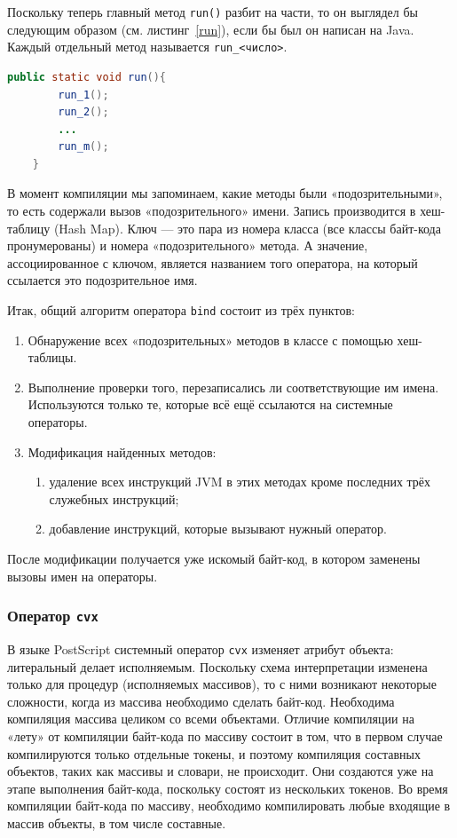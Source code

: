 \documentclass[14pt]{extarticle}
\begin{document}
	Поскольку теперь главный метод \texttt{run()} разбит на части, то он выглядел бы следующим образом (см. листинг~\ref{run}), если  бы был он написан на Java. Каждый отдельный метод называется \texttt{run\_<число>}.
	\begin{lstlisting}[label=run,caption=Структура метода run(),captionpos=b, frame = single, language = Java]
	public static void run(){
		run_1();	
		run_2();
		...
		run_m();		
	}
	\end{lstlisting}
	
	В момент компиляции мы запоминаем, какие методы были «подозрительными», то есть содержали вызов «подозрительного»  имени. Запись производится в хеш-таблицу (Hash Map). Ключ --- это пара из номера класса (все классы байт-кода пронумерованы) и номера «подозрительного» метода. А значение, ассоциированное с ключом, является названием того оператора, на который ссылается это подозрительное имя.
	
	Итак, общий алгоритм оператора \texttt{bind} состоит из трёх пунктов:
	\begin{enumerate}
		\item Обнаружение всех «подозрительных» методов в классе с помощью хеш-таблицы.
		\item Выполнение проверки того, перезаписались ли соответствующие им имена. Используются только те, которые всё ещё ссылаются на системные операторы.
		\item Модификация найденных методов:
				\begin{enumerate}
					\item удаление всех инструкций JVM в этих методах кроме последних трёх служебных инструкций;
					\item добавление инструкций, которые вызывают нужный оператор.
				\end{enumerate}				
	\end{enumerate}
	
	После модификации получается уже искомый байт-код, в котором  заменены вызовы имен на операторы.


	\subsubsection*{Оператор  \texttt{cvx}}		
	В языке PostScript системный оператор \texttt{cvx} изменяет атрибут объекта: литеральный делает исполняемым. Поскольку схема интерпретации изменена только для процедур (исполняемых массивов), то с ними возникают некоторые сложности, когда из массива необходимо сделать байт-код. Необходима компиляция массива целиком со всеми объектами. Отличие компиляции на «лету» от компиляции байт-кода по массиву состоит в том, что в первом случае компилируются только отдельные токены, и поэтому компиляция составных объектов, таких как массивы и словари, не происходит.  Они создаются уже на этапе выполнения байт-кода, поскольку состоят из нескольких токенов. Во время компиляции байт-кода по массиву, необходимо компилировать любые входящие в массив объекты, в том числе составные.
	
\end{document}
